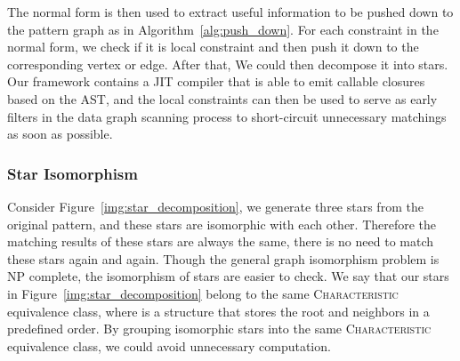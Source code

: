 The normal form is then used to extract useful information to be pushed down to the pattern graph as in Algorithm~\ref{alg:push_down}.
For each constraint in the normal form, we check if it is local constraint and then push it down to the corresponding vertex or edge.
After that, We could then decompose it into stars.
Our framework contains a JIT compiler that is able to emit callable closures based on the AST,
and the local constraints can then be used to serve as early filters in the data graph scanning process to short-circuit unnecessary matchings as soon as possible.
\subsubsection{Star Isomorphism}
Consider Figure~\ref{img:star_decomposition}, we generate three stars from the original pattern,
and these stars are isomorphic with each other.
Therefore the matching results of these stars are always the same,
there is no need to match these stars again and again.
Though the general graph isomorphism problem is NP complete,
the isomorphism of stars are easier to check.
We say that our stars in Figure~\ref{img:star_decomposition} belong to the same \textsc{Characteristic} equivalence class,
where  is a structure that stores the root and neighbors in a predefined order.
By grouping isomorphic stars into the same \textsc{Characteristic} equivalence class,
we could avoid unnecessary computation.
